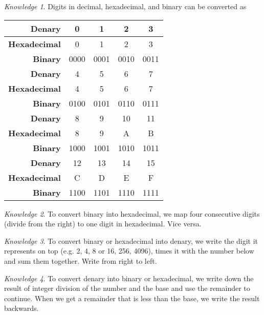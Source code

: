 \documentclass[8pt]{article}
\theoremstyle{remark}
\newtheorem{knowledge}{Knowledge}[subsection]
\begin{document}
        \begin{knowledge}
            Digits in decimal, hexadecimal, and binary can be converted as
            \begin{center}
                \begin{tabular}{r|c|c|c|c}
                    \textbf{Denary} & 0 & 1 & 2 & 3\\\hline
                    \textbf{Hexadecimal} & 0 & 1 & 2 & 3\\\hline
                    \textbf{Binary} & 0000 & 0001 & 0010 & 0011\\\hline\hline
                    \textbf{Denary} & 4 & 5 & 6 & 7\\\hline
                    \textbf{Hexadecimal} & 4 & 5 & 6 & 7\\\hline
                    \textbf{Binary} & 0100 & 0101 & 0110 & 0111\\\hline\hline
                    \textbf{Denary} & 8 & 9 & 10 & 11\\\hline
                    \textbf{Hexadecimal} & 8 & 9 & A & B\\\hline
                    \textbf{Binary} & 1000 & 1001 & 1010 & 1011\\\hline\hline
                    \textbf{Denary} & 12 & 13 & 14 & 15\\\hline
                    \textbf{Hexadecimal} & C & D & E & F\\\hline
                    \textbf{Binary} & 1100 & 1101 & 1110 & 1111\\
                \end{tabular}
            \end{center}
        \end{knowledge}
        
        \begin{knowledge}
            To convert binary into hexadecimal, we map four consecutive digits (divide from the right) to one digit in hexadecimal. Vice versa.
        \end{knowledge}

        \begin{knowledge}
            To convert binary or hexadecimal into denary, we write the digit it represents on top (e.g. 2, 4, 8 or 16, 256, 4096), times it with the number below and sum them together. Write from right to left.
        \end{knowledge}

        \begin{knowledge}
            To convert denary into binary or hexadecimal, we write down the result of integer division of the number and the base and use the remainder to continue. When we get a remainder that is less than the base, we write the result backwards.
        \end{knowledge}
\end{document}
